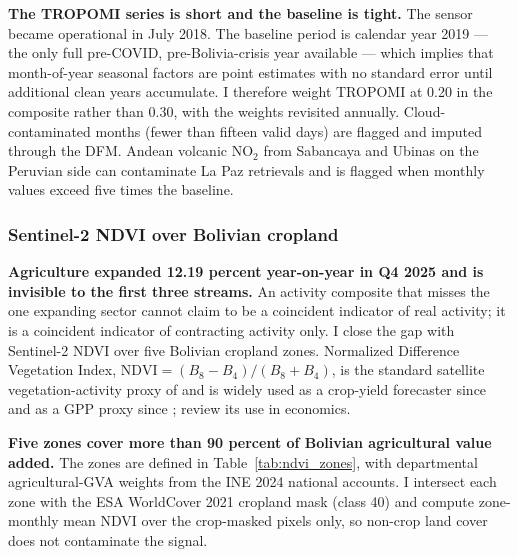 \documentclass[11pt,letterpaper]{article}
\newcommand{\claim}[1]{\textbf{#1.}}
\begin{document}
\claim{The TROPOMI series is short and the baseline is tight} The sensor became operational in July \num{2018}. The baseline period is calendar year \num{2019} --- the only full pre-COVID, pre-Bolivia-crisis year available --- which implies that month-of-year seasonal factors are point estimates with no standard error until additional clean years accumulate. I therefore weight TROPOMI at \num{0.20} in the composite rather than \num{0.30}, with the weights revisited annually. Cloud-contaminated months (fewer than fifteen valid days) are flagged and imputed through the DFM. Andean volcanic NO$_2$ from Sabancaya and Ubinas on the Peruvian side can contaminate La Paz retrievals and is flagged when monthly values exceed five times the baseline.

\subsubsection{Sentinel-2 NDVI over Bolivian cropland}

\claim{Agriculture expanded \num{12.19} percent year-on-year in Q4 \num{2025} and is invisible to the first three streams} An activity composite that misses the one expanding sector cannot claim to be a coincident indicator of real activity; it is a coincident indicator of contracting activity only. I close the gap with Sentinel-2 NDVI over five Bolivian cropland zones. Normalized Difference Vegetation Index, $\mathrm{NDVI} = (B_8 - B_4) / (B_8 + B_4)$, is the standard satellite vegetation-activity proxy of \citet{gao1996} and is widely used as a crop-yield forecaster since \citet{johnson_etal2014} and as a GPP proxy since \citet{donohue_etal2008}; \citet{donaldson_storeygard2016} review its use in economics.

\claim{Five zones cover more than \num{90} percent of Bolivian agricultural value added} The zones are defined in Table~\ref{tab:ndvi_zones}, with departmental agricultural-GVA weights from the INE \num{2024} national accounts. I intersect each zone with the ESA WorldCover \num{2021} cropland mask (class \num{40}) and compute zone-monthly mean NDVI over the crop-masked pixels only, so non-crop land cover does not contaminate the signal.
\end{document}
